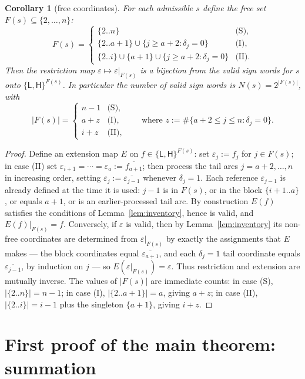 \documentclass[11pt]{article}
\newtheorem{corollary}[theorem]{Corollary}
\theoremstyle{definition}
\theoremstyle{remark}
\newcommand{\sL}{\mathsf{L}}
\newcommand{\sH}{\mathsf{H}}
\begin{document}
\begin{corollary}[free coordinates]\label{cor:free}
For each admissible $s$ define the \emph{free set} $F(s)\subseteq\{2,\dots,n\}$:
\[
  F(s)=
  \begin{cases}
   \{2..n\} & \text{(S)},\\
   \{2..a+1\}\cup\{j\ge a+2:\delta_j=0\} & \text{(I)},\\
   \{2..i\}\cup\{a+1\}\cup\{j\ge a+2:\delta_j=0\} & \text{(II)}.
  \end{cases}
\]
Then the restriction map $\varepsilon\mapsto\varepsilon|_{F(s)}$ is a
bijection from the valid sign words for $s$ onto $\{\sL,\sH\}^{F(s)}$. In
particular the number of valid sign words is $N(s)=2^{|F(s)|}$, with
\[
  |F(s)| =
  \begin{cases}
   n-1 & \text{(S)},\\
   a+z & \text{(I)},\\
   i+z & \text{(II)},
  \end{cases}
  \qquad\text{where } z:=\#\{a+2\le j\le n:\delta_j=0\}.
\]
\end{corollary}

\begin{proof}
Define an extension map $E$ on $f\in\{\sL,\sH\}^{F(s)}$: set
$\varepsilon_j:=f_j$ for $j\in F(s)$; in case (II) set
$\varepsilon_{i+1}=\cdots=\varepsilon_a:=\overline{f_{a+1}}$; then process
the tail arcs $j=a+2,\dots,n$ in increasing order, setting
$\varepsilon_j:=\overline{\varepsilon_{j-1}}$ whenever $\delta_j=1$. Each
reference $\varepsilon_{j-1}$ is already defined at the time it is used:
$j-1$ is in $F(s)$, or in the block $\{i+1..a\}$, or equals $a+1$, or is an
earlier-processed tail arc. By construction $E(f)$ satisfies the conditions
of Lemma~\ref{lem:inventory}, hence is valid, and $E(f)|_{F(s)}=f$.
Conversely, if $\varepsilon$ is valid, then by Lemma~\ref{lem:inventory}
its non-free coordinates are determined from $\varepsilon|_{F(s)}$ by
exactly the assignments that $E$ makes --- the block coordinates equal
$\overline{\varepsilon_{a+1}}$, and each $\delta_j=1$ tail coordinate
equals $\overline{\varepsilon_{j-1}}$, by induction on $j$ --- so
$E(\varepsilon|_{F(s)})=\varepsilon$. Thus restriction and extension are
mutually inverse. The values of $|F(s)|$ are immediate counts: in case (S),
$|\{2..n\}|=n-1$; in case (I), $|\{2..a+1\}|=a$, giving $a+z$; in case
(II), $|\{2..i\}|=i-1$ plus the singleton $\{a+1\}$, giving $i+z$.
\end{proof}

\section{First proof of the main theorem: summation}\label{sec:count}
\end{document}

